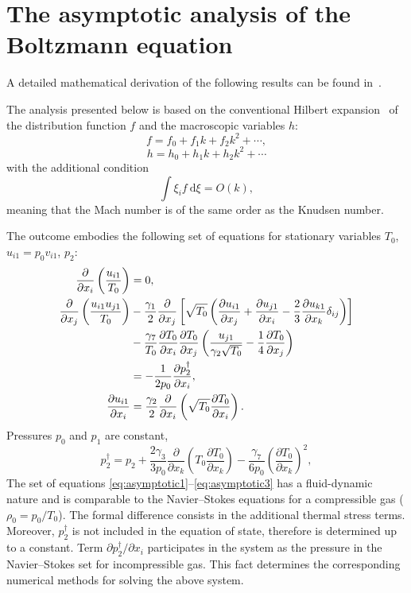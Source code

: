 \documentclass[smallextended, referee]{svjour3} %
\newcommand{\dd}{\:\mathrm{d}}
\newcommand{\pder}[2][]{\frac{\partial#1}{\partial#2}}
\begin{document}
\section{The asymptotic analysis of the Boltzmann equation}
A detailed mathematical derivation of the following results can be found in~\cite{Sone2002, Sone2007}.

The analysis presented below is based on the conventional Hilbert expansion~\cite{Hilbert1912}
of the distribution function \(f\) and the macroscopic variables \(h\):
\[ f = f_0 + f_1k + f_2k^2 + \cdots, \]
\[ h = h_0 + h_1k + h_2k^2 + \cdots \]
with the additional condition
\begin{equation}\label{eq:Mach_constraint}
	\int\xi_if\dd\xi = O(k),
\end{equation}
meaning that the Mach number is of the same order as the Knudsen number.

The outcome embodies the following set of equations for stationary variables \(T_0\), \(u_{i1} = p_0v_{i1}\), \(p_2\):
\begin{align}
	\pder{x_i}\left(\frac{u_{i1}}{T_0}\right) &= 0, \label{eq:asymptotic1} \\
	\pder{x_j}\left(\frac{u_{i1}u_{j1}}{T_0}\right)
		&-\frac{\gamma_1}2\pder{x_j}\left[\sqrt{T_0}\left(
			\pder[u_{i1}]{x_j}+\pder[u_{j1}]{x_i}-\frac23\pder[u_{k1}]{x_k}\delta_{ij}\right
		)\right] \notag\\
		&- \frac{\gamma_7}{T_0}\pder[T_0]{x_i}\pder[T_0]{x_j}\left(\frac{u_{j1}}{\gamma_2\sqrt{T_0}} - \frac{1}4\pder[T_0]{x_j}\right) \notag\\
		&= -\frac1{2p_0}\pder[p_2^\dag]{x_i}, \label{eq:asymptotic2} \\
	\pder[u_{i1}]{x_i} &= \frac{\gamma_2}2\pder{x_i}\left(\sqrt{T_0}\pder[T_0]{x_i}\right). \label{eq:asymptotic3}
\end{align}
Pressures \(p_0\) and \(p_1\) are constant,
\[ 
	p_2^\dag = p_2 + 
		\frac{2\gamma_3}{3p_0}\pder{x_k}\left(T_0\pder[T_0]{x_k}\right) -
		\frac{\gamma_7}{6p_0}\left(\pder[T_0]{x_k}\right)^2,
\]
The set of equations \eqref{eq:asymptotic1}--\eqref{eq:asymptotic3} has a fluid-dynamic nature
and is comparable to the Navier--Stokes equations for a compressible gas (\(\rho_0 = p_0/T_0\)).
The formal difference consists in the additional thermal stress terms.
Moreover, \(p_2^\dag\) is not included in the equation of state, therefore is determined up to a constant.
Term \(\partial{p_2 ^ \dag} / \partial{x_i}\) participates in the system as the pressure
in the Navier--Stokes set for incompressible gas.
This fact determines the corresponding numerical methods for solving the above system.
\end{document}

